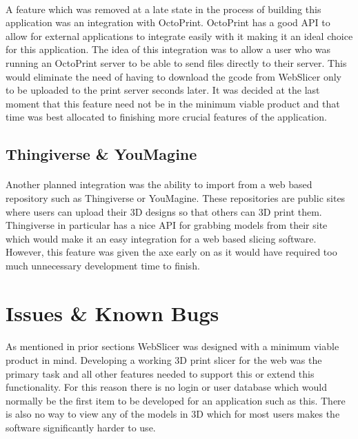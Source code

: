 \paragraph{}
A feature which was removed at a late state in the process of building this application was an integration with OctoPrint.
OctoPrint has a good API to allow for external applications to integrate easily with it making it an ideal choice for this application.
The idea of this integration was to allow a user who was running an OctoPrint server to be able to send files directly to their server.
This would eliminate the need of having to download the gcode from WebSlicer only to be uploaded to the print server seconds later.
It was decided at the last moment that this feature need not be in the minimum viable product and that time was best allocated to finishing more crucial features of the application.

\subsection{Thingiverse \& YouMagine}
\paragraph{}
Another planned integration was the ability to import from a web based repository such as Thingiverse or YouMagine.
These repositories are public sites where users can upload their 3D designs so that others can 3D print them.
Thingiverse in particular has a nice API for grabbing models from their site which would make it an easy integration for a web based slicing software.
However, this feature was given the axe early on as it would have required too much unnecessary development time to finish.

\section{Issues \& Known Bugs}
\paragraph{}
As mentioned in prior sections WebSlicer was designed with a minimum viable product in mind.
Developing a working 3D print slicer for the web was the primary task and all other features needed to support this or extend this functionality.
For this reason there is no login or user database which would normally be the first item to be developed for an application such as this.
There is also no way to view any of the models in 3D which for most users makes the software significantly harder to use.
